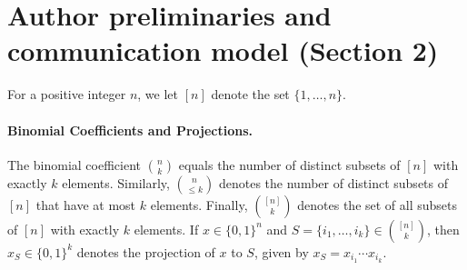 \section*{Author preliminaries and communication model (Section 2)}
For a positive integer $n$, we let $[n]$ denote the set $\{1,\ldots,n\}$.
\paragraph{Binomial Coefficients and Projections.} The binomial coefficient $\binom nk$ equals the number of distinct subsets of $[n]$ with exactly $k$ elements. Similarly, $\binom n{\le k}$ denotes the number of distinct subsets of $[n]$ that have at most $k$ elements. Finally, $\binom{[n]}k$ denotes the set of all subsets of $[n]$ with exactly $k$ elements.
If $x\in\{0,1\}^n$ and $S=\{i_1,\ldots,i_k\}\in\binom{[n]}k$, then $x_S\in\{0,1\}^k$ denotes the projection of $x$ to $S$, given by $x_S=x_{i_1}\cdots x_{i_k}$.
